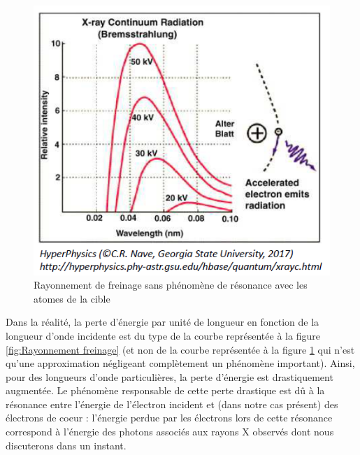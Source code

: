 \begin{figure}[tph]
    \centering
    \includegraphics[scale=1.0]{Images2/FreinageIdéalisé.PNG}
    \caption{Rayonnement de freinage sans phénomène de résonance avec les atomes de la cible}
    \label{fig:Freinage_idealise}
\end{figure}
Dans la réalité, la perte d'énergie par unité de longueur en fonction de la longueur d'onde incidente est du type de la courbe représentée à la figure \ref{fig:Rayonnement freinage} (et non de la courbe représentée à la figure \ref{fig:Freinage_idealise} qui n'est qu'une approximation négligeant complètement un phénomène important). Ainsi, pour des longueurs d'onde particulières, la perte d'énergie est drastiquement augmentée. Le phénomène responsable de cette perte drastique est dû à la résonance entre l'énergie de l'électron incident et (dans notre cas présent) des électrons de coeur : l'énergie perdue par les électrons lors de cette résonance correspond à l'énergie des photons associés aux rayons X observés dont nous discuterons dans un instant.\\
